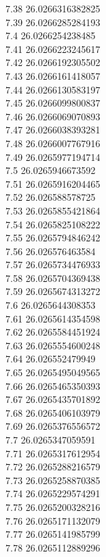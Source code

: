 {7.38	26.0266316382825\\
7.39	26.0266285284193\\
7.4	26.0266254238485\\
7.41	26.0266223245617\\
7.42	26.0266192305502\\
7.43	26.0266161418057\\
7.44	26.0266130583197\\
7.45	26.0266099800837\\
7.46	26.0266069070893\\
7.47	26.0266038393281\\
7.48	26.0266007767916\\
7.49	26.0265977194714\\
7.5	26.0265946673592\\
7.51	26.0265916204465\\
7.52	26.026588578725\\
7.53	26.0265855421864\\
7.54	26.0265825108222\\
7.55	26.0265794846242\\
7.56	26.026576463584\\
7.57	26.0265734476933\\
7.58	26.0265704369438\\
7.59	26.0265674313272\\
7.6	26.0265644308353\\
7.61	26.0265614354598\\
7.62	26.0265584451924\\
7.63	26.0265554600248\\
7.64	26.026552479949\\
7.65	26.0265495049565\\
7.66	26.0265465350393\\
7.67	26.0265435701892\\
7.68	26.0265406103979\\
7.69	26.0265376556572\\
7.7	26.0265347059591\\
7.71	26.0265317612954\\
7.72	26.0265288216579\\
7.73	26.0265258870385\\
7.74	26.0265229574291\\
7.75	26.0265200328216\\
7.76	26.0265171132079\\
7.77	26.0265141985799\\
7.78	26.0265112889296\\
}

